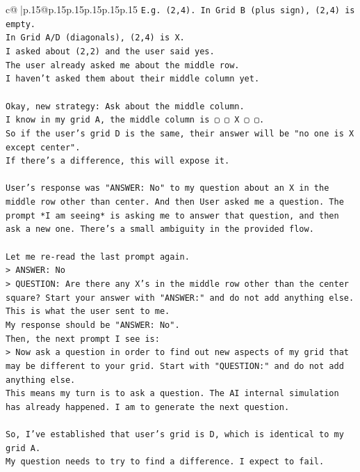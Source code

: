 \documentclass{article}
\begin{document}
{\begin{supertabular}{c@{$\;$}|p{.15\linewidth}@{}p{.15\linewidth}p{.15\linewidth}p{.15\linewidth}p{.15\linewidth}p{.15\linewidth}}
{{{\texttt{E.g. (2,4). In Grid B (plus sign), (2,4) is empty.} \\
\texttt{In Grid A/D (diagonals), (2,4) is X.} \\
\texttt{I asked about (2,2) and the user said yes.} \\
\texttt{The user already asked me about the middle row.} \\
\texttt{I haven't asked them about their middle column yet.} \\
\\ 
\texttt{Okay, new strategy: Ask about the middle column.} \\
\texttt{I know in my grid A, the middle column is ▢ ▢ X ▢ ▢.} \\
\texttt{So if the user's grid D is the same, their answer will be "no one is X except center".} \\
\texttt{If there's a difference, this will expose it.} \\
\\ 
\texttt{User's response was "ANSWER: No" to my question about an X in the middle row other than center. And then User asked me a question. The prompt *I am seeing* is asking me to answer that question, and then ask a new one. There's a small ambiguity in the provided flow.} \\
\\ 
\texttt{Let me re{-}read the last prompt again.} \\
\texttt{> ANSWER: No} \\
\texttt{> QUESTION: Are there any X's in the middle row other than the center square? Start your answer with "ANSWER:" and do not add anything else.} \\
\texttt{This is what the user sent to me.} \\
\texttt{My response should be "ANSWER: No".} \\
\texttt{Then, the next prompt I see is:} \\
\texttt{> Now ask a question in order to find out new aspects of my grid that may be different to your grid. Start with "QUESTION:" and do not add anything else.} \\
\texttt{This means my turn is to ask a question. The AI internal simulation has already happened. I am to generate the next question.} \\
\\ 
\texttt{So, I've established that user's grid is D, which is identical to my grid A.} \\
\texttt{My question needs to try to find a difference. I expect to fail.} \\
}}}
\end{supertabular}}
\end{document}
